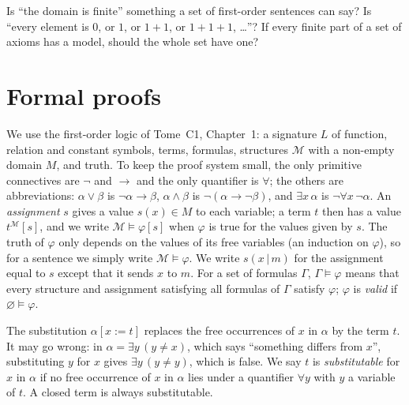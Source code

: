 \begin{think}
Is ``the domain is finite'' something a set of first-order sentences can say? Is ``every element is $0$, or $1$, or $1+1$, or $1+1+1$, \dots''? If every finite part of a set of axioms has a model, should the whole set have one?
\end{think}

\section{Formal proofs}\label{sec:formalproofs}

We use the first-order logic of Tome~C1, Chapter~1: a signature $L$ of function, relation and constant symbols, terms, formulas, structures $\mathcal M$ with a non-empty domain $M$, and truth. To keep the proof system small, the only primitive connectives are $\neg$ and $\to$ and the only quantifier is $\forall$; the others are abbreviations: $\alpha\lor\beta$ is $\neg\alpha\to\beta$, $\alpha\land\beta$ is $\neg(\alpha\to\neg\beta)$, and $\exists x\,\alpha$ is $\neg\forall x\,\neg\alpha$. An \emph{assignment} $s$ gives a value $s(x)\in M$ to each variable; a term $t$ then has a value $t^{\mathcal M}[s]$, and we write $\mathcal M\models\varphi[s]$ when $\varphi$ is true for the values given by $s$. The truth of $\varphi$ only depends on the values of its free variables (an induction on $\varphi$), so for a sentence we simply write $\mathcal M\models\varphi$. We write $s(x\,|\,m)$ for the assignment equal to $s$ except that it sends $x$ to $m$. For a set of formulas $\Gamma$, $\Gamma\models\varphi$ means that every structure and assignment satisfying all formulas of $\Gamma$ satisfy $\varphi$; $\varphi$ is \emph{valid} if $\varnothing\models\varphi$.

The substitution $\alpha[x:=t]$ replaces the free occurrences of $x$ in $\alpha$ by the term $t$. It may go wrong: in $\alpha=\exists y\,(y\ne x)$, which says ``something differs from $x$'', substituting $y$ for $x$ gives $\exists y\,(y\ne y)$, which is false. We say $t$ is \emph{substitutable} for $x$ in $\alpha$ if no free occurrence of $x$ in $\alpha$ lies under a quantifier $\forall y$ with $y$ a variable of $t$. A closed term is always substitutable.

